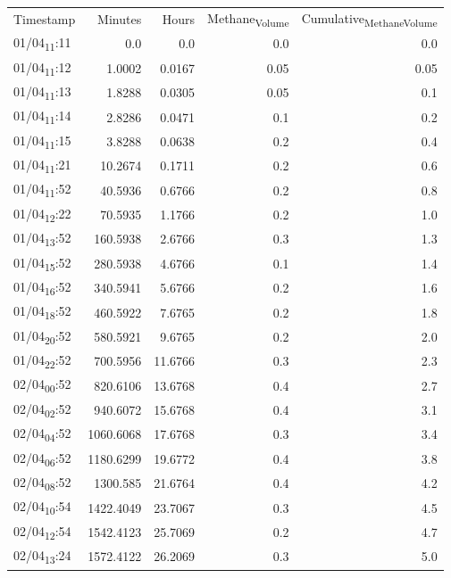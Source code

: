 \documentclass[11pt]{article}
\begin{document}
\begin{center}
\begin{tabular}{lrrrr}
Timestamp & Minutes & Hours & Methane\textsubscript{Volume} & Cumulative\textsubscript{Methane}\textsubscript{Volume}\\[0pt]
01/04\textsubscript{11}:11 & 0.0 & 0.0 & 0.0 & 0.0\\[0pt]
01/04\textsubscript{11}:12 & 1.0002 & 0.0167 & 0.05 & 0.05\\[0pt]
01/04\textsubscript{11}:13 & 1.8288 & 0.0305 & 0.05 & 0.1\\[0pt]
01/04\textsubscript{11}:14 & 2.8286 & 0.0471 & 0.1 & 0.2\\[0pt]
01/04\textsubscript{11}:15 & 3.8288 & 0.0638 & 0.2 & 0.4\\[0pt]
01/04\textsubscript{11}:21 & 10.2674 & 0.1711 & 0.2 & 0.6\\[0pt]
01/04\textsubscript{11}:52 & 40.5936 & 0.6766 & 0.2 & 0.8\\[0pt]
01/04\textsubscript{12}:22 & 70.5935 & 1.1766 & 0.2 & 1.0\\[0pt]
01/04\textsubscript{13}:52 & 160.5938 & 2.6766 & 0.3 & 1.3\\[0pt]
01/04\textsubscript{15}:52 & 280.5938 & 4.6766 & 0.1 & 1.4\\[0pt]
01/04\textsubscript{16}:52 & 340.5941 & 5.6766 & 0.2 & 1.6\\[0pt]
01/04\textsubscript{18}:52 & 460.5922 & 7.6765 & 0.2 & 1.8\\[0pt]
01/04\textsubscript{20}:52 & 580.5921 & 9.6765 & 0.2 & 2.0\\[0pt]
01/04\textsubscript{22}:52 & 700.5956 & 11.6766 & 0.3 & 2.3\\[0pt]
02/04\textsubscript{00}:52 & 820.6106 & 13.6768 & 0.4 & 2.7\\[0pt]
02/04\textsubscript{02}:52 & 940.6072 & 15.6768 & 0.4 & 3.1\\[0pt]
02/04\textsubscript{04}:52 & 1060.6068 & 17.6768 & 0.3 & 3.4\\[0pt]
02/04\textsubscript{06}:52 & 1180.6299 & 19.6772 & 0.4 & 3.8\\[0pt]
02/04\textsubscript{08}:52 & 1300.585 & 21.6764 & 0.4 & 4.2\\[0pt]
02/04\textsubscript{10}:54 & 1422.4049 & 23.7067 & 0.3 & 4.5\\[0pt]
02/04\textsubscript{12}:54 & 1542.4123 & 25.7069 & 0.2 & 4.7\\[0pt]
02/04\textsubscript{13}:24 & 1572.4122 & 26.2069 & 0.3 & 5.0\\[0pt]

\end{tabular}
\end{center}
\end{document}
